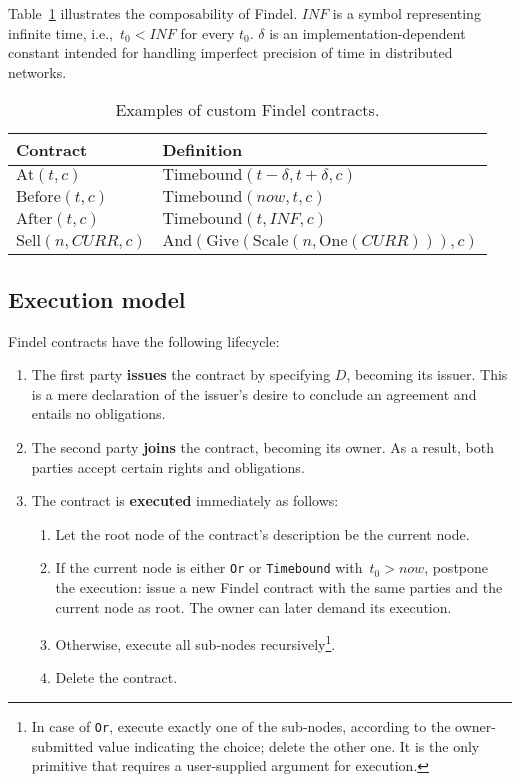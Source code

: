 Table~\ref{tab:Ch10FindelComposability} illustrates the composability of Findel.
$INF$ is a symbol representing infinite time, i.e.,~$t_0 < INF$ for every $t_0$.
$\delta$ is an implementation-dependent constant intended for handling imperfect precision of time in distributed networks.

\begin{table}
	\centering
	\caption{Examples of custom Findel contracts.}
	\begin{tabular}{|p{0.25\linewidth}|p{0.70\linewidth}|}
		\hline
		\textbf{Contract} & \textbf{Definition} \\
		\hline
		\(\mathrm{At}(t, c)\) & \(\mathrm{Timebound}(t - \delta, t + \delta, c)\) \\
		\hline
		\(\mathrm{Before}(t, c)\) & \(\mathrm{Timebound}(now, t, c)\) \\
		\hline
		\(\mathrm{After}(t, c)\) & \(\mathrm{Timebound}(t, INF, c)\) \\
		\hline
		\(\mathrm{Sell}(n, CURR, c)\) & \(\mathrm{And}(\mathrm{Give}(\mathrm{Scale}(n,\mathrm{One}(CURR))),c)\) \\
		\hline
	\end{tabular}
	\label{tab:Ch10FindelComposability}
\end{table}



\subsection{Execution model} \label{sec:Ch10FindelExecutionModel}

Findel contracts have the following lifecycle:

\begin{enumerate}
	\item The first party \textbf{issues} the contract by specifying $D$, becoming its issuer. This is a mere declaration of the issuer's desire to conclude an agreement and entails no obligations.
	\item The second party \textbf{joins} the contract, becoming its owner. As a result, both parties accept certain rights and obligations.
	\item The contract is \textbf{executed} immediately as follows:
	\begin{enumerate}
		\item Let the root node of the contract's description be the current node.
		\item If the current node is either \texttt{Or} or \texttt{Timebound} with~$t_0 > now$, postpone the execution: issue a new Findel contract with the same parties and the current node as root. The owner can later demand its execution.
		\item Otherwise, execute all sub-nodes recursively\footnote{In case of \texttt{Or}, execute exactly one of the sub-nodes, according to the owner-submitted value indicating the choice; delete the other one. It is the only primitive that requires a user-supplied argument for execution.}.
		\item Delete the contract.
	\end{enumerate}
\end{enumerate}

